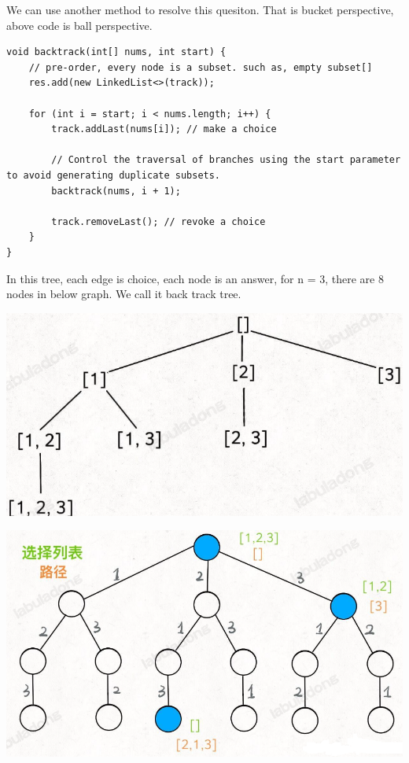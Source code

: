 \documentclass[a4paper,11pt,twoside]{book}
\begin{document}
	\par We can use another method to resolve this quesiton. That is bucket perspective, above code is ball perspective. 
	
\begin{lstlisting}
void backtrack(int[] nums, int start) {	
	// pre-order, every node is a subset. such as, empty subset[]
	res.add(new LinkedList<>(track));

	for (int i = start; i < nums.length; i++) {
		track.addLast(nums[i]); // make a choice
		
		// Control the traversal of branches using the start parameter to avoid generating duplicate subsets.
		backtrack(nums, i + 1);
		
		track.removeLast(); // revoke a choice
	}
}
\end{lstlisting}
	
	In this tree, each edge is choice, each node is an answer, for n = 3, there are 8 nodes in below graph. We call it back track tree. 
	


\begin{minipage}{.5\textwidth}		
	\begin{center}
		\includegraphics[width=0.9\linewidth]{pics/path1.png} 
	\end{center}
\end{minipage}	
\begin{minipage}{.5\textwidth}		
	\begin{center}
		\includegraphics[width=0.9\linewidth]{pics/path.png}
	\end{center}
\end{minipage}	
		
\end{document}
